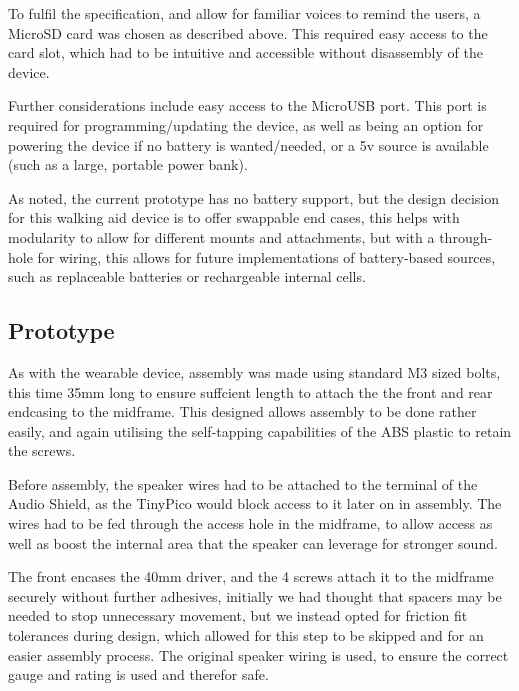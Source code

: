                     To fulfil the specification, and allow for familiar voices to remind the users, a MicroSD card was chosen as described above. This required easy access to the card slot, which had to be intuitive and accessible without disassembly of the device.
        
                    
        
                    Further considerations include easy access to the MicroUSB port. This port is required for programming/updating the device, as well as being an option for powering the device if no battery is wanted/needed, or a 5v source is available (such as a large, portable power bank).
        
                    As noted, the current prototype has no battery support, but the design decision for this walking aid device is to offer swappable end cases, this helps with modularity to allow for different mounts and attachments, but with a through-hole for wiring, this allows for future implementations of battery-based sources, such as replaceable batteries or rechargeable internal cells.
        
        
                \subsection{Prototype}
                \label{subsec:prototype_walking_aid}
        
                    As with the wearable device, assembly was made using standard M3 sized bolts, this time 35mm long to ensure suffcient length to attach the the front and rear endcasing to the midframe. This designed allows assembly to be done rather easily, and again utilising the self-tapping capabilities of the ABS plastic to retain the screws.
        
                    Before assembly, the speaker wires had to be attached to the terminal of the Audio Shield, as the TinyPico would block access to it later on in assembly. The wires had to be fed through the access hole in the midframe, to allow access as well as boost the internal area that the speaker can leverage for stronger sound.
        
                    
        
                    The front encases the 40mm driver, and the 4 screws attach it to the midframe securely without further adhesives, initially we had thought that spacers may be needed to stop unnecessary movement, but we instead opted for friction fit tolerances during design, which allowed for this step to be skipped and for an easier assembly process. The original speaker wiring is used, to ensure the correct gauge and rating is used and therefor safe.
        
